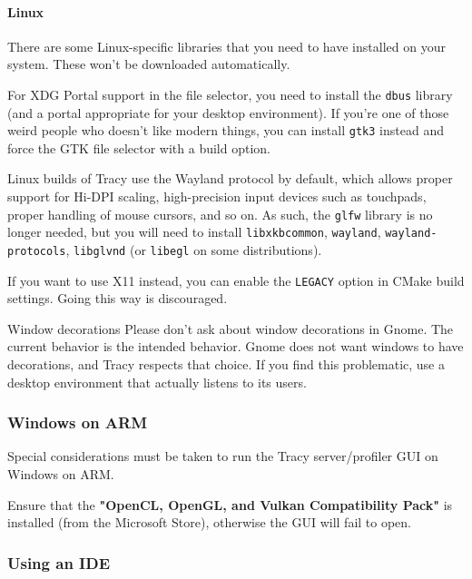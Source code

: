 \documentclass[hidelinks,titlepage,a4paper,twoside]{article}
\begin{document}
\paragraph{Linux}

There are some Linux-specific libraries that you need to have installed on your system. These won't be downloaded automatically.

For XDG Portal support in the file selector, you need to install the \texttt{dbus} library (and a portal appropriate for your desktop environment). If you're one of those weird people who doesn't like modern things, you can install \texttt{gtk3} instead and force the GTK file selector with a build option.

Linux builds of Tracy use the Wayland protocol by default, which allows proper support for Hi-DPI scaling, high-precision input devices such as touchpads, proper handling of mouse cursors, and so on. As such, the \texttt{glfw} library is no longer needed, but you will need to install \texttt{libxkbcommon}, \texttt{wayland}, \texttt{wayland-protocols}, \texttt{libglvnd} (or \texttt{libegl} on some distributions).

If you want to use X11 instead, you can enable the \texttt{LEGACY} option in CMake build settings. Going this way is discouraged.

\begin{bclogo}[
noborder=true,
couleur=black!5,
logo=\bcbombe
]{Window decorations}
Please don't ask about window decorations in Gnome. The current behavior is the intended behavior. Gnome does not want windows to have decorations, and Tracy respects that choice. If you find this problematic, use a desktop environment that actually listens to its users.
\end{bclogo}

\subsubsection{Windows on ARM}

Special considerations must be taken to run the Tracy server/profiler GUI on Windows on ARM.

Ensure that the \textbf{"OpenCL, OpenGL, and Vulkan Compatibility Pack"} is installed (from the Microsoft Store), otherwise the GUI will fail to open.

\subsubsection{Using an IDE}
\end{document}
